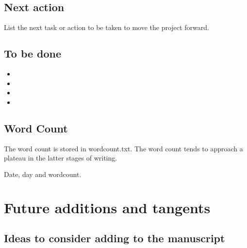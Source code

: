 \documentclass[10pt,letterpaper]{article}
\newcommand{\bi}{\begin{itemize}}
\newcommand{\ei}{\end{itemize}}
\begin{document}
\subsection{Next action}
\label{sub:next}

List the next task or action to be taken to move the project forward.

\subsection{To be done}
\label{sub:to-do}

\bi
\item 
\item 
\item 
\item 
\ei



\subsection{Word Count}
\label{sub:wordcount}

The word count is stored in wordcount.txt.
The word count tends to approach a plateau in the latter stages of writing.

\begin{figure}[htp!]
  \centering
\end{figure}

\begin{table}[]
  \centering
  \caption{Date, day and wordcount.}
  \label{tab:my_label}
\end{table}


\section{Future additions and tangents}
\label{sec:future}


\subsection{Ideas to consider adding to the manuscript}
\label{subsec:new-ideas}
\end{document}
